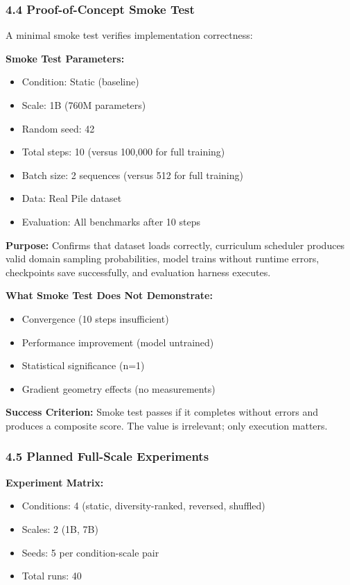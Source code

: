 \subsubsection{4.4 Proof-of-Concept Smoke Test}

A minimal smoke test verifies implementation correctness:

\textbf{Smoke Test Parameters:}
\begin{itemize}
\item Condition: Static (baseline)
\item Scale: 1B (760M parameters)
\item Random seed: 42
\item Total steps: 10 (versus 100,000 for full training)
\item Batch size: 2 sequences (versus 512 for full training)
\item Data: Real Pile dataset
\item Evaluation: All benchmarks after 10 steps
\end{itemize}

\textbf{Purpose:} Confirms that dataset loads correctly, curriculum scheduler produces valid domain sampling probabilities, model trains without runtime errors, checkpoints save successfully, and evaluation harness executes.

\textbf{What Smoke Test Does Not Demonstrate:}
\begin{itemize}
\item Convergence (10 steps insufficient)
\item Performance improvement (model untrained)
\item Statistical significance (n=1)
\item Gradient geometry effects (no measurements)
\end{itemize}

\textbf{Success Criterion:} Smoke test passes if it completes without errors and produces a composite score. The value is irrelevant; only execution matters.

\subsubsection{4.5 Planned Full-Scale Experiments}

\textbf{Experiment Matrix:}
\begin{itemize}
\item Conditions: 4 (static, diversity-ranked, reversed, shuffled)
\item Scales: 2 (1B, 7B)
\item Seeds: 5 per condition-scale pair
\item Total runs: 40
\end{itemize}

